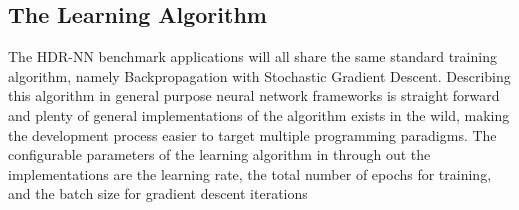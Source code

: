 \begin{center}
\end{center}

\subsection[HDR-NN Training]{The Learning Algorithm}

The HDR-NN benchmark applications will all share the same standard training algorithm, namely Backpropagation with Stochastic Gradient Descent. Describing this algorithm in general purpose neural network frameworks is straight forward and plenty of general implementations of the algorithm exists in the wild, making the development process easier to target multiple programming paradigms. The configurable parameters of the learning algorithm in through out the implementations are the learning rate, the total number of epochs for training, and the batch size for gradient descent iterations


